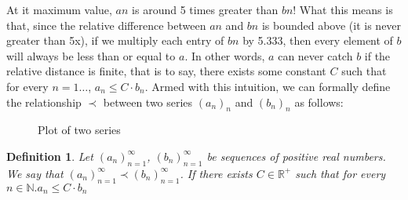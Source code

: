 \documentclass[11pt]{article}
\newtheorem{definition}{Definition}
\begin{document}
At it maximum value, $an$ is around 5 times greater than $bn$! What this means is that, since the relative difference between $an$ and $bn$ is bounded above (it is never greater than 5x), if we multiply each entry of $bn$ by 5.333, then every element of $b$ will always be less than or equal to $a$. In other words, $a$ can never catch $b$ if the relative distance is finite, that is to say, there exists some constant $C$ such that for every $n=1\ldots$, $a_n \leq C \cdot b_n$. Armed with this intuition, we can formally define the relationship $\prec$ between two series $(a_n)_n$ and $(b_n)_n$ as follows:


\begin{figure*}[h!]
	\centering
	\scalebox{0.5}{}
	\caption{Plot of two series}
	\label{fig:growth-2}
\end{figure*}


\begin{definition}
	Let $(a_n)_{n=1}^\infty$, $(b_n)_{n=1}^\infty$ be sequences of positive real numbers. We say that $(a_n)_{n=1}^\infty \prec (b_n)_{n=1}^\infty$. If there exists $C\in\mathbb{R}^{+}$ such that for every $n\in\mathbb{N}. a_n \leq C\cdot b_n$
\end{definition}
\end{document}
